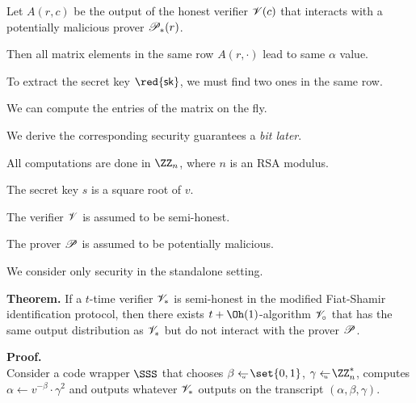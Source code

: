 \documentclass[landscape,footrule]{foils}
\renewcommand{\SK}{{\red{\mathsf{sk}}}}
\begin{document}

Let $A(r,c)$ be the output of the honest verifier $\mathscr{V}(c)$ that
interacts with a potentially malicious prover $\mathscr{P}_*(r)$.
\begin{triangles}
\item Then all matrix elements in the same row $A(r,\cdot)$ lead to same $\alpha$ value.
\item To extract the secret key $\SK$, we must find two ones in the same row.
\item We can compute the entries of the matrix on the fly.
\end{triangles}

We derive the corresponding security guarantees a \emph{bit later}.




All computations are done in $\ZZ_n$, where $n$ is an RSA modulus.
\begin{triangles}
  \item The secret key $s$ is a square root of $v$.
  \item The verifier $\mathscr{V}$ is assumed to be semi-honest.
  \item The prover $\mathscr{P}$ is assumed to be potentially malicious. 
  \item We consider only security in the standalone setting.
\end{triangles}




\textbf{Theorem.}  If a $t$-time verifier $\mathscr{V}_*$ is semi-honest
in the modified Fiat-Shamir identification protocol, then there exists
$t+\Oh(1)$-algorithm $\mathscr{V}_{\circ}$ that has the same output
distribution as $\mathscr{V}_*$ but do not interact with the prover
$\mathscr{P}$.
\bigskip

\textbf{Proof.}\\
Consider a code wrapper $\SSS$ that chooses $\beta\getsu\set{0,1}$,
$\gamma\getsu\ZZ_n^*$, computes $\alpha\gets v^{-\beta}\cdot \gamma^2$
and outputs whatever $\mathscr{V}_*$ outputs on the transcript
$(\alpha,\beta,\gamma)$.
\end{document}
